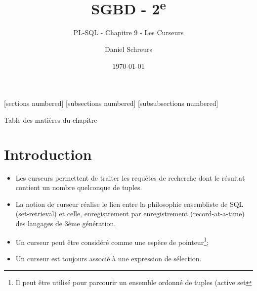 \documentclass[10pt]{beamer}
\title{SGBD - 2\textsuperscript{e}}
\subtitle{PL-SQL - Chapitre 9 - Les Curseurs}
\date{\today}
\author{Daniel Schreurs}
\institute{Haute École de Province de Liège}
\begin{document}
\maketitle

[sections numbered]
[subsections numbered]
[subsubsections numbered]
\begin{frame}[allowframebreaks]{Table des matières du chapitre}
    \tableofcontents[subsectionstyle=show/show/hide,subsubsectionstyle=show/show/hide,]
\end{frame}

\section{Introduction}
\begin{frame}{\secname}
    \begin{itemize}
        \item Les curseurs permettent de traiter les requêtes de recherche dont le résultat contient un nombre quelconque de tuples.
        \item La notion de curseur réalise le lien entre la philosophie ensembliste de SQL (set-retrieval) et celle, enregistrement par enregistrement (record-at-a-time) des langages de 3ème génération.
    \end{itemize}
\end{frame}

\begin{frame}{\secname}
    \begin{itemize}
        \item Un curseur peut être considéré comme une espèce de pointeur\footnote{Il peut être utilisé pour parcourir un ensemble ordonné de tuples (active set};
        \item Un curseur est toujours associé à une expression de sélection.
    \end{itemize}
\end{frame}

\begin{frame}{\secname}
    
\end{frame}
\end{document}
